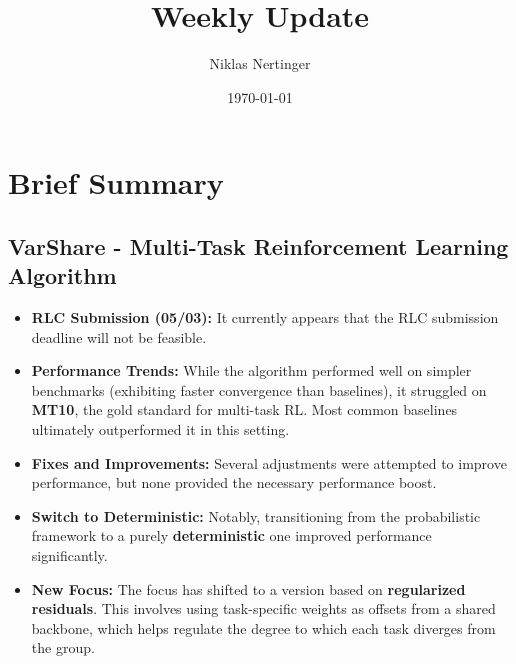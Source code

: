 \documentclass[11pt,a4paper]{article}
\title{Weekly Update}
\author{Niklas Nertinger}
\date{\today}
\begin{document}
\maketitle

\section{Brief Summary}

\subsection*{VarShare - Multi-Task Reinforcement Learning Algorithm}
\begin{itemize}
    \item \textbf{RLC Submission (05/03):} It currently appears that the RLC submission deadline will not be feasible.
    \item \textbf{Performance Trends:} While the algorithm performed well on simpler benchmarks (exhibiting faster convergence than baselines), it struggled on \textbf{MT10}, the gold standard for multi-task RL. Most common baselines ultimately outperformed it in this setting.
    \item \textbf{Fixes and Improvements:} Several adjustments were attempted to improve performance, but none provided the necessary performance boost.
    \item \textbf{Switch to Deterministic:} Notably, transitioning from the probabilistic framework to a purely \textbf{deterministic} one improved performance significantly.
    \item \textbf{New Focus:} The focus has shifted to a version based on \textbf{regularized residuals}. This involves using task-specific weights as offsets from a shared backbone, which helps regulate the degree to which each task diverges from the group.
\end{itemize}
\end{document}

